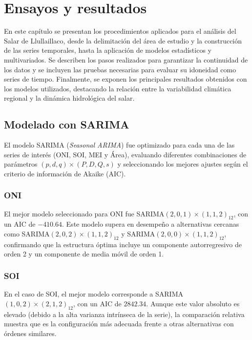 
\chapter{Ensayos y resultados} %

\label{Chapter4} %
En este capítulo se presentan los procedimientos aplicados para el análisis del Salar de Llullaillaco, desde la delimitación del área de estudio y la construcción de las series temporales, hasta la aplicación de modelos estadísticos y multivariados. Se describen los pasos realizados para garantizar la continuidad de los datos y se incluyen las pruebas necesarias para evaluar su idoneidad como series de tiempo. Finalmente, se exponen los principales resultados obtenidos con los modelos utilizados, destacando la relación entre la variabilidad climática regional y la dinámica hidrológica del salar.




\section{Modelado con SARIMA}

El modelo SARIMA (\textit{Seasonal ARIMA}) fue optimizado para cada una de las series de interés (ONI, SOI, MEI y Área), evaluando diferentes combinaciones de parámetros $(p,d,q)\times(P,D,Q,s)$ y seleccionando los mejores ajustes según el criterio de información de Akaike (AIC). 

\subsection{ONI}
El mejor modelo seleccionado para ONI fue SARIMA$(2,0,1)\times(1,1,2)_{12}$, con un AIC de $-410.64$. Este modelo supera en desempeño a alternativas cercanas como SARIMA$(2,0,2)\times(1,1,2)_{12}$ y SARIMA$(2,0,0)\times(1,1,2)_{12}$, confirmando que la estructura óptima incluye un componente autorregresivo de orden 2 y un componente de media móvil de orden 1.

\subsection{SOI}
En el caso de SOI, el mejor modelo corresponde a SARIMA$(1,0,2)\times(2,1,2)_{12}$, con un AIC de $2842.34$. Aunque este valor absoluto es elevado (debido a la alta varianza intrínseca de la serie), la comparación relativa muestra que es la configuración más adecuada frente a otras alternativas con órdenes similares.

